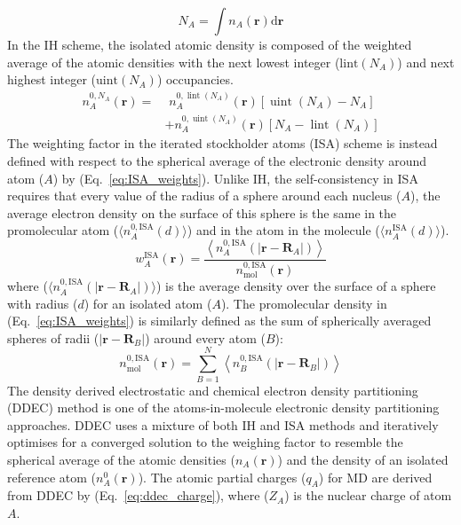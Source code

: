 %
\begin{equation}
    N_A = \int n_A (\mathbf{r}) \mathrm{d}\mathbf{r}
\end{equation}
%
In the IH scheme, the isolated atomic density is composed of the weighted average of the atomic densities with the next lowest integer ($\mathrm{lint}(N_A)$) and next highest integer ($\mathrm{uint}(N_A)$) occupancies. %
\begin{equation}
\begin{aligned}
n_{A}^{0, N_{A}}(\mathbf{r})=& \,\,n_{A}^{0, \operatorname{lint}\left(N_{A}\right)}(\mathbf{r})\left[\operatorname{uint}\left(N_{A}\right)-N_{A}\right] \\
&+n_{A}^{0, \operatorname{uint}\left(N_{A}\right)}(\mathbf{r})\left[N_{A}-\operatorname{lint}\left(N_{A}\right)\right]
\end{aligned}
\end{equation}
The weighting factor in the iterated stockholder atoms (ISA) scheme \cite{lillestolen2008redefining} is instead defined with respect to the spherical average of the electronic density around atom ($A$) by (Eq.~\ref{eq:ISA_weights}). Unlike IH, the self-consistency in ISA requires that every value of the radius of a sphere around each nucleus ($A$), the average electron density on the surface of this sphere is the same in the promolecular atom ($\langle n_{A}^{0, \mathrm{ISA}}(d)\rangle$) and in the atom in the molecule ($\langle n_{A}^{\mathrm{ISA}}(d)\rangle$).\cite{bultinck2009comparison}
%
\begin{equation} \label{eq:ISA_weights}
w_{A}^{\mathrm{ISA}}(\mathbf{r})=\frac{\left\langle n_{A}^{0,\mathrm{ISA}}\left(\left|\mathbf{r}-\mathbf{R}_{A}\right|\right)\right\rangle}{n_{\mathrm{mol}}^{0, \mathrm{ISA}}(\mathbf{r})}
\end{equation}
where ($\langle n_{A}^{0, \mathrm{ISA}}\left(\left|\mathbf{r}-\mathbf{R}_{A}\right|\right)\rangle$) is the average density over the surface of a sphere with radius ($d$) for an isolated atom ($A$). The promolecular density in (Eq.~\ref{eq:ISA_weights}) is similarly defined as the sum of spherically averaged spheres of radii ($|\mathbf{r} - \mathbf{R}_B|$) around every atom ($B$):
%
\begin{equation}
n_{\mathrm{mol}}^{0, \mathrm{ISA}}(\mathbf{r})=\sum_{B=1}^{N}\left\langle n_{B}^{0, \mathrm{ISA}}\left(\left|\mathbf{r}-\mathbf{R}_{B}\right|\right)\right\rangle
\end{equation}
The density derived electrostatic and chemical electron density partitioning (DDEC) method is one of the atoms-in-molecule electronic density partitioning approaches. DDEC uses a mixture of both IH and ISA methods and iteratively optimises for a converged solution to the weighing factor to resemble the spherical average of the atomic densities ($n_{A}(\mathbf{r})$) and the density of an isolated reference atom ($n_{A}^0(\mathbf{r})$). The atomic partial charges ($q_A$) for MD are derived from DDEC by (Eq.~\ref{eq:ddec_charge}), where ($Z_A$) is the nuclear charge of atom $A$. 
